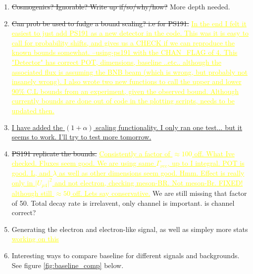 \documentclass[11pt, a4paper]{article}
\newcommand{\newtext}[2]{\textcolor{#1}{\ul{#2}}}
\begin{document}
\begin{enumerate}
\item \sout{Cosmogenics? Ignorable? Write up if/so/why/how?} More depth needed.

\item \sout{Can prob be used to fudge a bound scaling? i.e for PS191.}
\newtext{MARK}{In the end I felt it easiest to just add PS191 as a new detector
in the code. This was it is easy to call for probability shifts, and gives us a
CHECK if we can reproduce the known bounds somewhat.  --using-ps191 with the
CHAN\_FLAG of 4.  This "Detector" has correct POT, dimensions, baseline ..etc..
although the associated flux is assuming the BNB beam (which is wrong, but
probably not insanely wrong). I also wrote two new functions to call the upper
and lower 90\% C.L bounds from an experiment, given the observed bound.
Although currently bounds are done out of code in the plotting scripts, needs
to be updated then. }

\item \newtext{PB}{I have added the $(1+\alpha)$ scaling functionality. I only
ran one test... but it seems to work. I'll try to test more tomorrow.} 

\item \sout{PS191 replicate the bounds.} \newtext{MARK}{Consistently a factor of $\approx 100$ off. What Ive checked. Fluxes seem good. We are using same $\Gamma_{\nu ee}$, up to I integral. POT is good. L, and $\lambda$ as well as other dimensions seem good. Hmm. Effect is really only in $\vert U_{\mu 4}\vert^2$ and not electron, checking meson-BR. Not meson-Br. FIXED! although still $\approx 50$ off. Lets say conservative.} 
	We are still missing that factor of 50. Total decay rate is irrelavent, only channel is important. is channel correct?

\item Generating the electron and electron-like signal, as well as simpley more stats \newtext{MARK}{working on this}

\item Interesting ways to compare baseline for different signals and backgrounds. See figure \ref{fig:baseline_comp} below.


\end{enumerate}
\end{document}
